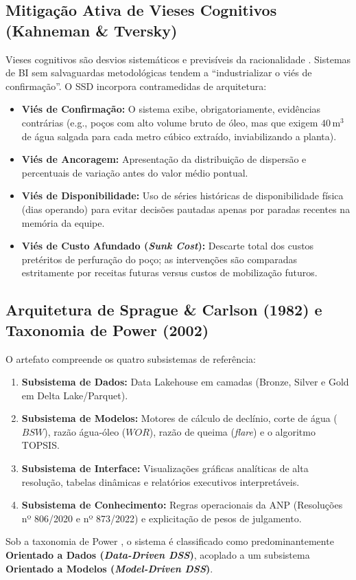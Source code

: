 \documentclass[12pt,a4paper]{article}
\begin{document}
\subsection{Mitigação Ativa de Vieses Cognitivos (Kahneman \& Tversky)}
Vieses cognitivos são desvios sistemáticos e previsíveis da racionalidade \cite{kahneman2012}. Sistemas de BI sem salvaguardas metodológicas tendem a ``industrializar o viés de confirmação''. O SSD incorpora contramedidas de arquitetura:
\begin{itemize}[leftmargin=*]
    \item \textbf{Viés de Confirmação:} O sistema exibe, obrigatoriamente, evidências contrárias (e.g., poços com alto volume bruto de óleo, mas que exigem $40\,\text{m}^3$ de água salgada para cada metro cúbico extraído, inviabilizando a planta).
    \item \textbf{Viés de Ancoragem:} Apresentação da distribuição de dispersão e percentuais de variação antes do valor médio pontual.
    \item \textbf{Viés de Disponibilidade:} Uso de séries históricas de disponibilidade física (dias operando) para evitar decisões pautadas apenas por paradas recentes na memória da equipe.
    \item \textbf{Viés de Custo Afundado (\textit{Sunk Cost}):} Descarte total dos custos pretéritos de perfuração do poço; as intervenções são comparadas estritamente por receitas futuras versus custos de mobilização futuros.
\end{itemize}

\subsection{Arquitetura de Sprague \& Carlson (1982) e Taxonomia de Power (2002)}
O artefato compreende os quatro subsistemas de referência:
\begin{enumerate}
    \item \textbf{Subsistema de Dados:} Data Lakehouse em camadas (Bronze, Silver e Gold em Delta Lake/Parquet).
    \item \textbf{Subsistema de Modelos:} Motores de cálculo de declínio, corte de água ($BSW$), razão água-óleo ($WOR$), razão de queima (\textit{flare}) e o algoritmo TOPSIS.
    \item \textbf{Subsistema de Interface:} Visualizações gráficas analíticas de alta resolução, tabelas dinâmicas e relatórios executivos interpretáveis.
    \item \textbf{Subsistema de Conhecimento:} Regras operacionais da ANP (Resoluções nº 806/2020 e nº 873/2022) e explicitação de pesos de julgamento.
\end{enumerate}
Sob a taxonomia de Power \cite{power2002}, o sistema é classificado como predominantemente \textbf{Orientado a Dados (\textit{Data-Driven DSS})}, acoplado a um subsistema \textbf{Orientado a Modelos (\textit{Model-Driven DSS})}.
\end{document}
